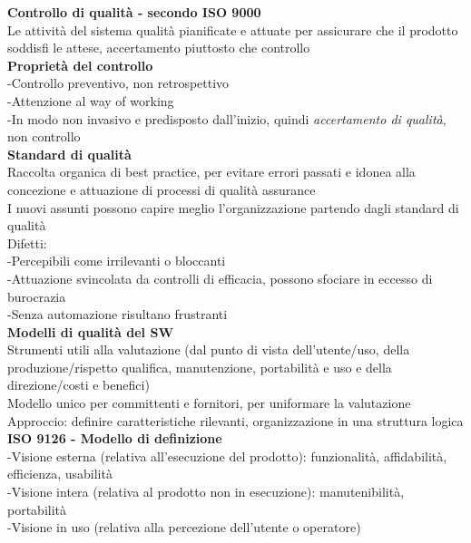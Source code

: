 \documentclass{article}
\begin{document}
		\textbf{Controllo di qualità - secondo ISO 9000}\\
		Le attività del sistema qualità pianificate e attuate per assicurare che il prodotto soddisfi le attese, accertamento piuttosto che controllo\\
		
		\textbf{Proprietà del controllo}\\
		-Controllo preventivo, non retrospettivo\\
		-Attenzione al way of working\\
		-In modo non invasivo e predisposto dall'inizio, quindi \textit{accertamento di qualità}, non controllo\\
		
		\textbf{Standard di qualità}\\
		Raccolta organica di best practice, per evitare errori passati e idonea alla concezione e attuazione di processi di qualità assurance\\
		I nuovi assunti possono capire meglio l'organizzazione partendo dagli standard di qualità\\
		Difetti:\\
		-Percepibili come irrilevanti o bloccanti\\
		-Attuazione svincolata da controlli di efficacia, possono sfociare in eccesso di burocrazia\\
		-Senza automazione risultano frustranti\\
		
		\textbf{Modelli di qualità del SW}\\
		Strumenti utili alla valutazione (dal punto di vista dell'utente/uso, della produzione/rispetto qualifica, manutenzione, portabilità e uso e della direzione/costi e benefici)\\
		Modello unico per committenti e fornitori, per uniformare la valutazione\\
		Approccio: definire caratteristiche rilevanti, organizzazione in una struttura logica\\
		
		\textbf{ISO 9126 - Modello di definizione}\\
		-Visione esterna (relativa all'esecuzione del prodotto): funzionalità, affidabilità, efficienza, usabilità\\
		-Visione intera (relativa al prodotto non in esecuzione): manutenibilità, portabilità\\
		-Visione in uso (relativa alla percezione dell'utente o operatore)\\
		
\end{document}
